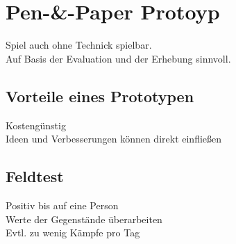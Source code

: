 \chapter{Pen-\&-Paper Protoyp}
Spiel auch ohne Technick spielbar.\\ 
Auf Basis der Evaluation und der Erhebung sinnvoll.

\section{Vorteile eines Prototypen} 
Kostengünstig\\
Ideen und Verbesserungen können direkt einfließen\\


\section{Feldtest} 
Positiv bis auf eine Person \\
Werte der Gegenstände überarbeiten\\
Evtl. zu wenig Kämpfe pro Tag


















